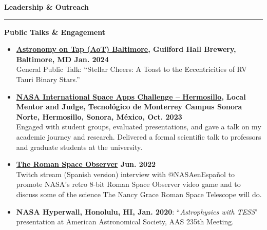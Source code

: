 \documentclass[letter,12pt]{article}
\begin{document}
\bigskip
\noindent
{\bf Leadership \& Outreach} \\
\vspace{-10mm}
\begin{center}
\rule{\textwidth}{0.2mm}
\end{center}
\vspace{-3mm}

\noindent
\vspace{-3mm}
{\bf Public Talks \& Engagement} \\
\vspace{-13mm}
\begin{center}
\end{center}
\vspace{-3mm}
\begin{itemize}
    \item \textbf{\href{https://astronomyontap.org/event/astronomy-on-tap-baltimore-january-edition/}{Astronomy on Tap (AoT) Baltimore}, Guilford Hall Brewery, Baltimore, MD \hfill Jan. 2024} \\
    General Public Talk: ``Stellar Cheers: A Toast to the Eccentricities of RV Tauri Binary Stars.''
    
    \item \textbf{\href{https://www.spaceappschallenge.org/2023/locations/hermosillo/?tab=schedule}{NASA International Space Apps Challenge -- Hermosillo}, Local Mentor and Judge, Tecnol\'{o}gico de Monterrey Campus Sonora Norte, Hermosillo, Sonora, M\'{e}xico, Oct. 2023} \\
    Engaged with student groups, evaluated presentations, and gave a talk on my academic journey and research. Delivered a formal scientific talk to professors and graduate students at the university.

    \item \textbf{\href{https://www.twitch.tv/videos/1316037901}{The Roman Space Observer} \hfill Jun. 2022} \\
    Twitch stream (Spanish version) interview with @NASAenEspa\~nol to promote NASA's retro 8-bit Roman Space Observer video game and to discuss some of the science The Nancy Grace Roman Space Telescope will do.

    \item \textbf{NASA Hyperwall, Honolulu, HI,  Jan. 2020}: ``{\it Astrophysics with TESS}" presentation at American Astronomical Society, AAS 235th Meeting.
\end{itemize}
\end{document}

